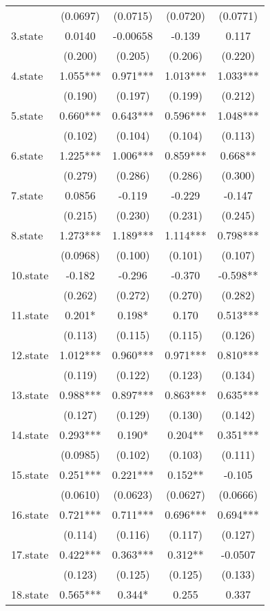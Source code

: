 \documentclass[]{article}
\begin{document}
\begin{tabular}{lcccc}
 & (0.0697) & (0.0715) & (0.0720) & (0.0771) \\
3.state & 0.0140 & -0.00658 & -0.139 & 0.117 \\
 & (0.200) & (0.205) & (0.206) & (0.220) \\
4.state & 1.055*** & 0.971*** & 1.013*** & 1.033*** \\
 & (0.190) & (0.197) & (0.199) & (0.212) \\
5.state & 0.660*** & 0.643*** & 0.596*** & 1.048*** \\
 & (0.102) & (0.104) & (0.104) & (0.113) \\
6.state & 1.225*** & 1.006*** & 0.859*** & 0.668** \\
 & (0.279) & (0.286) & (0.286) & (0.300) \\
7.state & 0.0856 & -0.119 & -0.229 & -0.147 \\
 & (0.215) & (0.230) & (0.231) & (0.245) \\
8.state & 1.273*** & 1.189*** & 1.114*** & 0.798*** \\
 & (0.0968) & (0.100) & (0.101) & (0.107) \\
10.state & -0.182 & -0.296 & -0.370 & -0.598** \\
 & (0.262) & (0.272) & (0.270) & (0.282) \\
11.state & 0.201* & 0.198* & 0.170 & 0.513*** \\
 & (0.113) & (0.115) & (0.115) & (0.126) \\
12.state & 1.012*** & 0.960*** & 0.971*** & 0.810*** \\
 & (0.119) & (0.122) & (0.123) & (0.134) \\
13.state & 0.988*** & 0.897*** & 0.863*** & 0.635*** \\
 & (0.127) & (0.129) & (0.130) & (0.142) \\
14.state & 0.293*** & 0.190* & 0.204** & 0.351*** \\
 & (0.0985) & (0.102) & (0.103) & (0.111) \\
15.state & 0.251*** & 0.221*** & 0.152** & -0.105 \\
 & (0.0610) & (0.0623) & (0.0627) & (0.0666) \\
16.state & 0.721*** & 0.711*** & 0.696*** & 0.694*** \\
 & (0.114) & (0.116) & (0.117) & (0.127) \\
17.state & 0.422*** & 0.363*** & 0.312** & -0.0507 \\
 & (0.123) & (0.125) & (0.125) & (0.133) \\
18.state & 0.565*** & 0.344* & 0.255 & 0.337 \\

\end{tabular}
\end{document}
